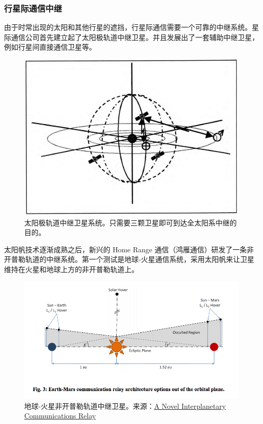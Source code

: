 \documentclass[letterpaper,10pt]{sphinxmanual}
\begin{document}
\subsubsection{行星际通信中继}
\label{tech:id3}
由于时常出现的太阳和其他行星的遮挡，行星际通信需要一个可靠的中继系统。星际通信公司首先建立起了太阳极轨道中继卫星。并且发展出了一套辅助中继卫星，例如行星间直接通信卫星等。
\begin{figure}[htbp]
\centering
\capstart

\includegraphics{solarRelaySat.png}
\caption{太阳极轨道中继卫星系统。只需要三颗卫星即可到达全太阳系中继的目的。}\end{figure}

太阳帆技术逐渐成熟之后，新兴的 Home Range 通信（鸿雁通信）研发了一条非开普勒轨道的中继系统。第一个测试是地球-火星通信系统，采用太阳帆来让卫星维持在火星和地球上方的非开普勒轨道上。
\begin{figure}[htbp]
\centering
\capstart

\includegraphics{nonKeplerianRelaySat.png}
\caption{地球-火星非开普勒轨道中继卫星。来源：\href{http://strathprints.strath.ac.uk/25836/2/Macdonald\_M\_-\_strathprints\_-\_A\_novel\_interplanetary\_communications\_relay\_Aug\_2010.pdf}{A Novel Interplanetary Communications Relay}}\end{figure}
\end{document}
